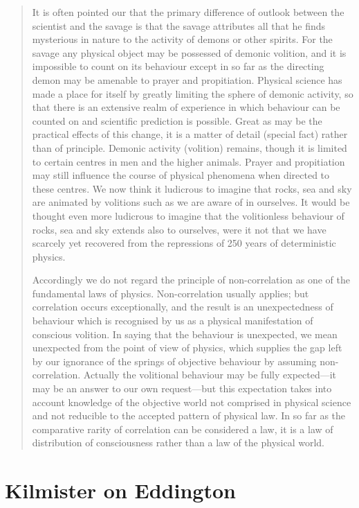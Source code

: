\begin{quote}
    It is often pointed our that the primary difference of outlook between the scientist and the savage is that the savage attributes all that he finds mysterious in nature to the activity of demons or other spirits.  For the savage any physical object may be possessed of demonic volition, and it is impossible to count on its behaviour except in so far as the directing demon may be amenable to prayer and propitiation.  Physical science has made a place for itself by greatly limiting the sphere of demonic activity, so that there is an extensive realm of experience in which behaviour can be counted on and scientific prediction is possible.  Great as may be the practical effects of this change, it is a matter of detail (special fact) rather than of principle.  Demonic activity (volition) remains, though it is limited to certain centres in men and the higher animals.  Prayer and propitiation may still influence the course of physical phenomena when directed to these centres.  We now think it ludicrous to imagine that rocks, sea and sky are animated by volitions such as we are aware of in ourselves.  It would be thought even more ludicrous to imagine that the volitionless behaviour of rocks, sea and sky extends also to ourselves, were it not that we have scarcely yet recovered from the repressions of 250 years of deterministic physics.  

    Accordingly we do not regard the principle of non-correlation as one of the fundamental laws of physics.  Non-correlation usually applies; but correlation occurs exceptionally, and the result is an unexpectedness of behaviour which is recognised by us as a physical manifestation of conscious volition.  In saying that the behaviour is unexpected, we mean unexpected from the point of view of physics, which supplies the gap left by our ignorance of the springs of objective behaviour by assuming non-correlation.  Actually the volitional behaviour may be fully expected---it may be an answer to our own request---but this expectation takes into account knowledge of the objective world not comprised in physical science and not reducible to the accepted pattern of physical law.  In so far as the comparative rarity of correlation can be considered a law, it is a law of distribution of consciousness rather than a law of the physical world.  \citep[p. 219-220]{Eddington1939}
\end{quote}


\section{Kilmister on Eddington}

